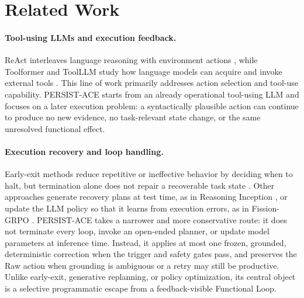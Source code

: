 \section{Related Work}



\paragraph{Tool-using LLMs and execution feedback.}
ReAct interleaves language reasoning with environment actions
\citep{yao2023react}, while Toolformer and ToolLLM study how language models
can acquire and invoke external tools \citep{schick2023toolformer,qin2023toollm}.
This line of work primarily addresses action selection and tool-use
capability. PERSIST-ACE starts from an already operational tool-using LLM and
focuses on a later execution problem: a syntactically plausible action can
continue to produce no new evidence, no task-relevant state change, or the
same unresolved functional effect.

\paragraph{Execution recovery and loop handling.}
Early-exit methods reduce repetitive or ineffective behavior by deciding when
to halt, but termination alone does not repair a recoverable task state
\citep{lu2025runaway}. Other approaches generate recovery plans at test time,
as in Reasoning Inception \citep{kim2026rein}, or update the LLM policy so
that it learns from execution errors, as in Fission-GRPO
\citep{zhang2026fission}. PERSIST-ACE takes a narrower and more conservative
route: it does not terminate every loop, invoke an open-ended planner, or
update model parameters at inference time. Instead, it applies at most one
frozen, grounded, deterministic correction when the trigger and safety gates
pass, and preserves the Raw action when grounding is ambiguous or a retry may
still be productive. Unlike early-exit, generative replanning, or policy
optimization, its central object is a selective programmatic escape from a
feedback-visible Functional Loop.
